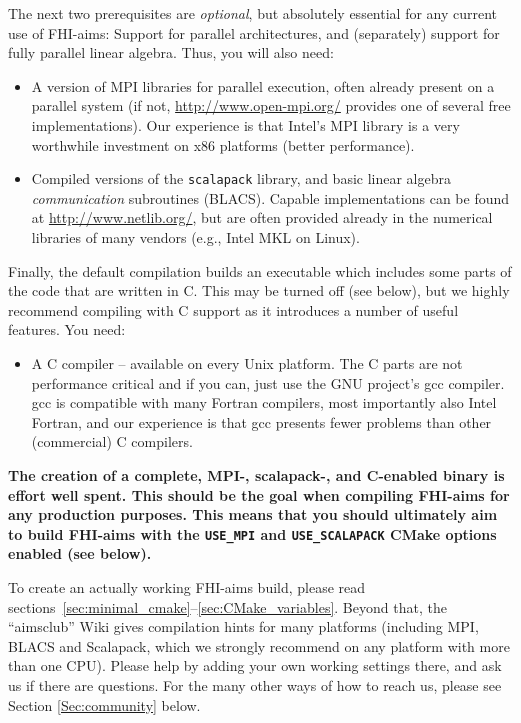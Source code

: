 The next two prerequisites are \emph{optional}, but absolutely
essential for any current use of FHI-aims: Support for parallel
architectures, and (separately) support for fully parallel
linear algebra. Thus, you will also
need: 
\begin{itemize}
  \item A version of MPI libraries for parallel execution, often already
    present on a parallel system (if not,
    \url{http://www.open-mpi.org/} provides one of several free
    implementations). Our experience is that Intel's MPI library is
    a very worthwhile investment on x86 platforms (better performance).
  \item Compiled versions of the \texttt{scalapack} library, and
     basic linear algebra \emph{communication} subroutines (BLACS). Capable
     implementations can be found at \url{http://www.netlib.org/}, but
     are often provided already in the numerical libraries of many
     vendors (e.g., Intel MKL on Linux).
\end{itemize}
Finally, the default compilation builds an executable which includes
some parts of the code that are written in C. This may be turned off (see
below), but we highly recommend compiling with C support as it introduces a
number of useful features.  You need:
\begin{itemize}
  \item A C compiler -- available on every Unix platform. The C parts
    are not performance critical and if you can, just use the GNU
    project's gcc compiler. gcc is compatible with many Fortran
    compilers, most importantly also Intel Fortran, and our experience
    is that gcc presents fewer problems than other (commercial) C
    compilers. 
\end{itemize}
  
\textbf{The creation of a complete, MPI-, scalapack-, and C-enabled binary
  is effort well spent. This should be the goal when compiling FHI-aims
  for any production purposes. This means that you should ultimately
  aim to build FHI-aims with the \texttt{USE\_MPI} and \texttt{USE\_SCALAPACK} CMake options enabled (see below).}

To create an actually working FHI-aims build, please read sections~\ref{sec:minimal_cmake}--\ref{sec:CMake_variables}. Beyond that, the ``aimsclub'' Wiki gives
compilation hints for many platforms (including MPI, BLACS and
Scalapack, which we strongly recommend on any platform with more than
one CPU). Please help by adding your own working settings there, and
ask us if there are questions. For the many other ways of how to reach
us, please see Section \ref{Sec:community} below.

